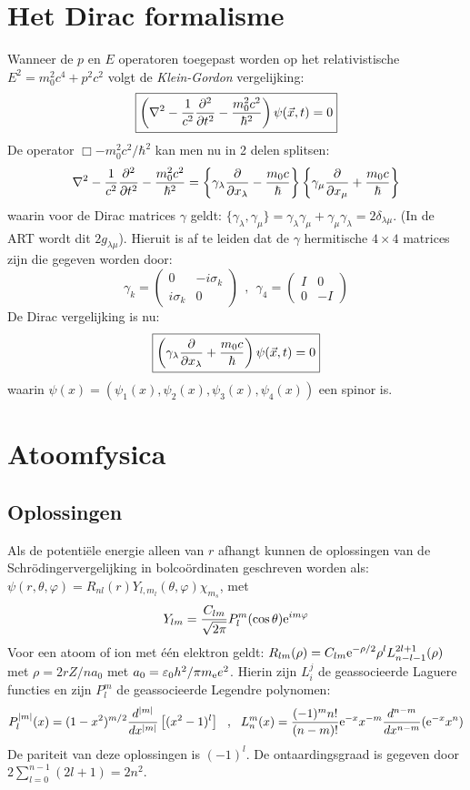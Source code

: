 \section[~~Het Dirac formalisme]{Het Dirac formalisme}
Wanneer de $p$ en $E$ operatoren toegepast worden op het relativistische
$E^2=m_0^2c^4+p^2c^2$ volgt de {\it Klein-Gordon} vergelijking:
\[
\mbox{\fbox{$\displaystyle
\left(\nabla^2-\frac{1}{c^2}\frac{\partial^2 }{\partial t^2}-\frac{m_0^2c^2}{\hbar^2}\right)\psi(\vec{x},t)=0
$}}
\]
De operator $\Box-m_0^2c^2/\hbar^2$ kan men nu in 2 delen splitsen:
\[
\nabla^2-\frac{1}{c^2}\frac{\partial^2 }{\partial t^2}-\frac{m_0^2c^2}{\hbar^2}=
\left\{\gamma_\lambda\frac{\partial }{\partial x_\lambda}-\frac{m_0c}{\hbar}\right\}
\left\{\gamma_\mu\frac{\partial }{\partial x_\mu}+\frac{m_0c}{\hbar}\right\}
\]
waarin voor de Dirac matrices $\gamma$ geldt:
$\{\gamma_\lambda,\gamma_\mu\}=
\gamma_\lambda\gamma_\mu+\gamma_\mu\gamma_\lambda=2\delta_{\lambda\mu}$.
(In de ART wordt dit $2g_{\lambda\mu}$).
Hieruit is af te leiden dat de $\gamma$ hermitische $4\times4$ matrices zijn
die gegeven worden door:
\[
\gamma_k=\left(\begin{array}{cc}0&-i\sigma_k\\i\sigma_k&0\end{array}\right)~~,~~
\gamma_4=\left(\begin{array}{cc}I&0\\0&-I\end{array}\right)
\]
De Dirac vergelijking is nu:
\[
\mbox{\fbox{$\displaystyle
\left(\gamma_\lambda\frac{\partial }{\partial x_\lambda}+\frac{m_0c}{\hbar}\right)\psi(\vec{x},t)=0
$}}
\]
waarin $\psi(x)=(\psi_1(x),\psi_2(x),\psi_3(x),\psi_4(x))$ een spinor is.

\section[~~Atoomfysica]{Atoomfysica}
\subsection[~~Oplossingen]{Oplossingen}
Als de potenti\"ele energie alleen van $r$ afhangt kunnen de oplossingen van
de Schr\"odingervergelijking in bolco\"ordinaten geschreven worden als:
$\psi(r,\theta,\varphi)=R_{nl}(r)Y_{l,m_l}(\theta,\varphi)\chi_{m_s}$, met
\[
Y_{lm}=\frac{C_{lm}}{\sqrt{2\pi}}P_l^m(\cos\theta){\rm e}^{im\varphi}
\]
Voor een atoom of ion met \'e\'en elektron geldt:
$\displaystyle
R_{lm}(\rho)=C_{lm}{\rm e}^{-\rho/2}\rho^l L_{n-l-1}^{2l+1}(\rho)$
\npar
met $\rho=2rZ/na_0$ met $a_0=\varepsilon_0 h^2/\pi m_{\rm e} e^2$. Hierin zijn
$L_i^j$ de geassocieerde Laguere functies en zijn $P_l^m$ de geassocieerde
Legendre polynomen:
\[
P_l^{|m|}(x)=(1-x^2)^{m/2}\frac{d^{|m|}}{dx^{|m|}}\left[(x^2-1)^l\right]~~,~~
L_n^m(x)=\frac{(-1)^mn!}{(n-m)!}{\rm e}^{-x}x^{-m}\frac{d^{n-m}}{dx^{n-m}}({\rm e}^{-x}x^n)
\]
De pariteit van deze oplossingen is $(-1)^l$. De ontaardingsgraad is gegeven
door $2\sum\limits_{l=0}^{n-1}(2l+1)=2n^2$.

